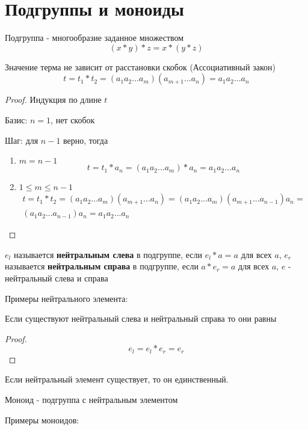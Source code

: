 \documentclass[../main/document.tex]{subfiles}
\begin{document}
\section{Подгруппы и моноиды}
\begin{dfn}
Подгруппа - многообразие заданное множеством
$$(x*y)*z=x*(y*z)$$
\end{dfn}
\begin{thm}
Значение терма не зависит от расстановки скобок (Ассоциативный закон)
$$t=t_1*t_2=(a_{1}a_{2}...a_{m})(a_{m+1}...a_n)=a_{1}a_{2}...a_{n}$$
\begin{proof}
Индукция по длине $t$

Базис: $n=1$, нет скобок

Шаг: для $n-1$ верно, тогда
\begin{enumerate}
\item $m=n-1$
$$t=t_1*a_n=(a_{1}a_{2}...a_{m})*a_n=a_{1}a_{2}...a_{n}$$
\item $1\leq m\leq n-1$
\begin{multline*}
t=t_1*t_2=(a_{1}a_{2}...a_{m})(a_{m+1}...a_n)=(a_{1}a_{2}...a_{m})(a_{m+1}...a_{n-1})a_n=\\
(a_{1}a_{2}...a_{n-1})a_n=a_{1}a_{2}...a_{n}
\end{multline*}
\end{enumerate}
\end{proof}
\end{thm}
\begin{dfn}
$e_l$ называется \textbf{нейтральным слева} в подгруппе, если $e_l*a=a$ для всех $a$,
$e_r$ называется \textbf{нейтральным справа} в подгруппе, если $a*e_r=a$ для всех $a$,
$e$ - нейтральный слева и справа
\end{dfn}
\begin{exm}
Примеры нейтрального элемента:
\end{exm}
\begin{thm}
Если существуют нейтральный слева и нейтральный справа то они равны
\begin{proof}
$$e_l=e_l*e_r=e_r$$
\end{proof}
\end{thm}
\begin{cnsq}
Если нейтральный элемент существует, то он единственный.
\end{cnsq}
\begin{dfn}
Моноид - подгруппа с нейтральным элементом
\end{dfn}
\begin{exm}
Примеры моноидов:
\end{exm}
\end{document}
